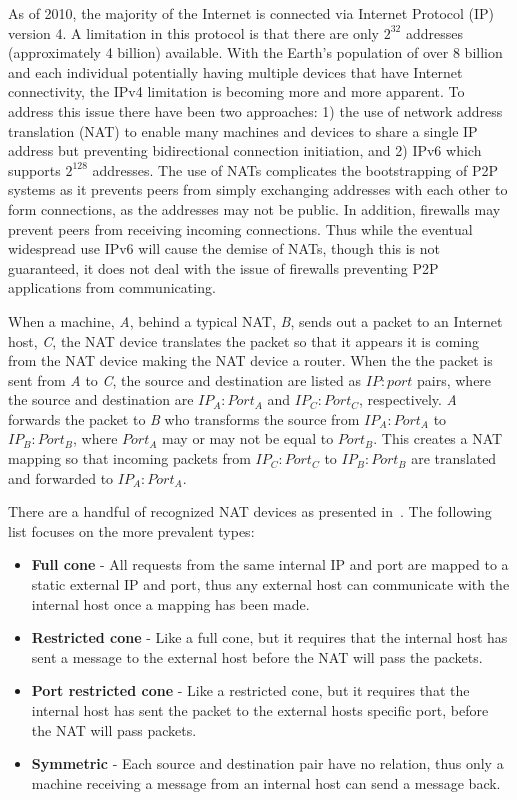 \documentclass[conference]{IEEEtran}
\begin{document}
As of 2010, the majority of the Internet is connected via Internet Protocol
(IP) version 4.  A limitation in this protocol is that there are only $2^{32}$
addresses (approximately 4 billion) available.  With the Earth's population of
over 8 billion and each individual potentially having multiple devices that
have Internet connectivity, the IPv4 limitation is becoming more and more
apparent.  To address this issue there have been two approaches:  1) the use of
network address translation (NAT) to enable many machines and devices to share
a single IP address but preventing bidirectional connection initiation, and 2)
IPv6 which supports $2^{128}$ addresses.  The use of NATs complicates the
bootstrapping of P2P systems as it prevents peers from simply exchanging
addresses with each other to form connections, as the addresses may not be
public.  In addition, firewalls may prevent peers from receiving incoming
connections.  Thus while the eventual widespread use IPv6 will cause the demise
of NATs, though this is not guaranteed, it does not deal with the issue of
firewalls preventing P2P applications from communicating.

When a machine, \textit{A}, behind a typical NAT, \textit{B}, sends out a
packet to an Internet host, \textit{C}, the NAT device translates the packet so
that it appears it is coming from the NAT device making the NAT device a router.
When the the packet is sent from \textit{A} to \textit{C}, the source and
destination are listed as $IP:port$ pairs, where the source and destination are
$IP_A:Port_A$ and $IP_C:Port_C$, respectively.  \textit{A} forwards the packet
to \textit{B} who transforms the source from $IP_A:Port_A$ to $IP_B:Port_B$,
where $Port_A$ may or may not be equal to $Port_B$.  This creates a NAT mapping
so that incoming packets from $IP_C:Port_C$ to $IP_B:Port_B$ are translated and
forwarded to $IP_A:Port_A$.

There are a handful of recognized NAT devices as presented in~\cite{stun,
p2p_nats_rfc}.  The following list focuses on the more prevalent types:
\begin{itemize}
\item \textbf{Full cone} - All requests from the same internal IP and port are
mapped to a static external IP and port, thus any external host can communicate
with the internal host once a mapping has been made.
\item \textbf{Restricted cone} - Like a full cone, but it requires that the
internal host has sent a message to the external host before the NAT will pass
the packets.
\item \textbf{Port restricted cone} - Like a restricted cone, but it requires
that the internal host has sent the packet to the external hosts specific port,
before the NAT will pass packets.
\item \textbf{Symmetric} - Each source and destination pair have no relation,
thus only a machine receiving a message from an internal host can send a
message back.
\end{itemize}
\end{document}
